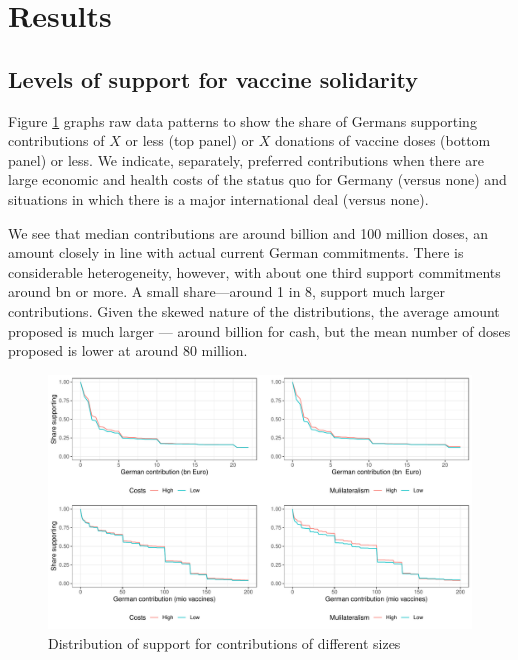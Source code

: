 \documentclass[]{article}
\begin{document}

\section{Results}
\label{sec:results}


\subsection{Levels of support for vaccine solidarity}

Figure \ref{fig:hist1} graphs raw data patterns to show the share of Germans supporting contributions of \texteuro $X$ or less (top panel) or $X$ donations of vaccine doses (bottom panel) or less. We indicate, separately, preferred contributions when there are large economic and health costs of the status quo for Germany (versus none) and situations in which there is a major international deal (versus none).

We see that median contributions are around  billion and 100 million doses,  an amount closely in line with actual current German commitments.%
There is considerable heterogeneity, however, with about one third support commitments around  bn or more. A small share---around 1 in 8, support much larger contributions. Given the skewed nature of the distributions, the average amount proposed is much larger --- around   billion for cash, but the mean number of doses proposed is lower at around 80 million. 

\begin{figure}[hbt!]
	\includegraphics[width=\linewidth]{"../2_output/cumulative.pdf"}
	\caption{Distribution of support for contributions of different sizes}
	\label{fig:hist1}
\end{figure}
\end{document}
